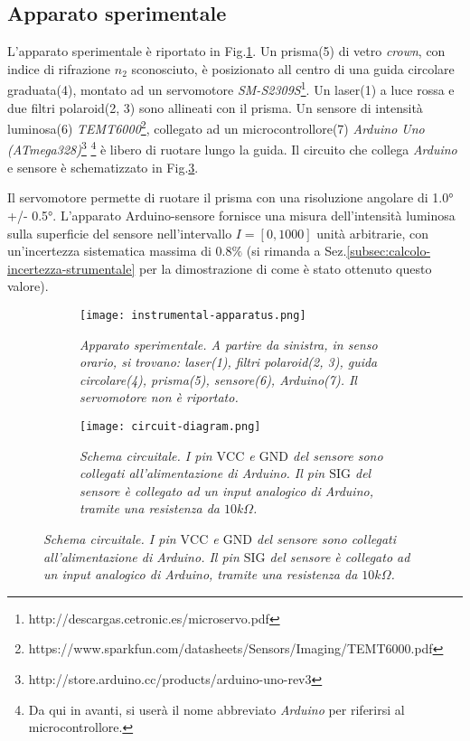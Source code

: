 \subsection{Apparato sperimentale}\label{subsec:apparato-sperimentale}
  L’apparato sperimentale è riportato in Fig.\ref{fig:apparato-strumentale}.
  Un prisma(5) di vetro \emph{crown}, con indice di rifrazione $n_2$ sconosciuto,  è posizionato all centro di una guida circolare graduata(4),
  montato ad un servomotore \emph{SM-S2309S}\footnote{http://descargas.cetronic.es/microservo.pdf}.
  Un laser(1) a luce rossa e due filtri polaroid(2, 3) sono
  allineati con il prisma. Un sensore di intensità luminosa(6) \emph{TEMT6000}\footnote{https://www.sparkfun.com/datasheets/Sensors/Imaging/TEMT6000.pdf},
  collegato ad un microcontrollore(7) \emph{Arduino Uno (ATmega328)}\footnote{http://store.arduino.cc/products/arduino-uno-rev3}
  \footnote{Da qui in avanti, si userà il nome abbreviato \emph{Arduino} per riferirsi al microcontrollore.}
  è libero di ruotare lungo la guida.
  Il circuito che collega \emph{Arduino} e sensore è schematizzato in Fig.\ref{fig:diagramma-circuito}.

  Il servomotore permette di ruotare il prisma con una risoluzione angolare di 1.0° +/- 0.5°.
  L'apparato Arduino-sensore fornisce una misura dell'intensità luminosa
  sulla superficie del sensore nell'intervallo $I = [0, 1000]$ unità arbitrarie,
  con un'incertezza sistematica massima di $0.8\%$ (si rimanda a Sez.\ref{subsec:calcolo-incertezza-strumentale}
  per la dimostrazione di come è stato ottenuto questo valore).
%
  \begin{figure}[h]
    \centering
    \caption{Apparato sperimentale e schema circuitale.}
    \begin{subfigure}{.4\textwidth}
      \texttt{[image: instrumental-apparatus.png]}
      \caption{
        \emph{
          Apparato sperimentale. A partire da sinistra, in senso orario,
          si trovano: laser(1), filtri polaroid(2, 3), guida circolare(4),
          prisma(5), sensore(6), Arduino(7). Il servomotore non è riportato.
        }
      }
      \label{fig:apparato-strumentale}
    \end{subfigure}%
    \hspace{20mm}
    \begin{subfigure}{.4\textwidth}
      \texttt{[image: circuit-diagram.png]}
      \caption{
        \emph{
          Schema circuitale. I pin $\text{VCC}$ e $\text{GND}$ del sensore sono collegati
          all'alimentazione di Arduino. Il pin $\text{SIG}$
          del sensore è collegato ad un input analogico di Arduino, tramite una
          resistenza da $10k\Omega$.
        }
      }
      \label{fig:diagramma-circuito}
    \end{subfigure}
  \end{figure}
%
